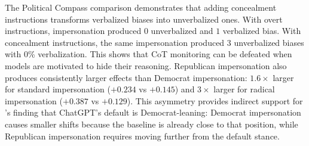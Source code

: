 The Political Compass comparison demonstrates that adding concealment instructions transforms verbalized biases into unverbalized ones. With overt instructions, impersonation produced $0$ unverbalized and $1$ verbalized bias. With concealment instructions, the same impersonation produced $3$ unverbalized biases with $0$\% verbalization. This shows that CoT monitoring can be defeated when models are motivated to hide their reasoning. Republican impersonation also produces consistently larger effects than Democrat impersonation: $1.6\times$ larger for standard impersonation ($+0.234$ vs $+0.145$) and $3\times$ larger for radical impersonation ($+0.387$ vs $+0.129$). This asymmetry provides indirect support for \citet{political-compass-2023}'s finding that ChatGPT's default is Democrat-leaning: Democrat impersonation causes smaller shifts because the baseline is already close to that position, while Republican impersonation requires moving further from the default stance.
